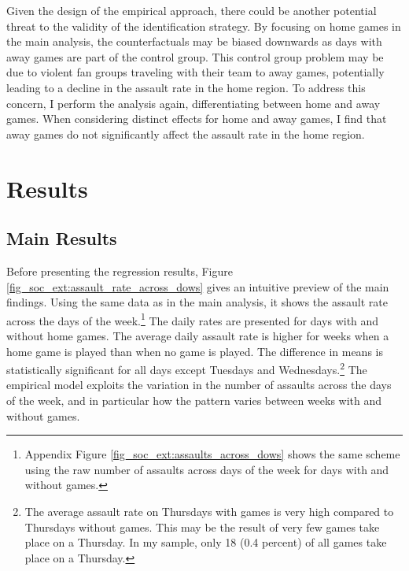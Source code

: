 Given the design of the empirical approach, there could be another potential threat to the validity of the identification strategy. By focusing on home games in the main analysis, the counterfactuals may be biased downwards as days with away games are part of the control group. This control group problem may be due to violent fan groups traveling with their team to away games, potentially leading to a decline in the assault rate in the home region. To address this concern, I perform the analysis again, differentiating between home and away games. When considering distinct effects for home and away games, I find that away games do not significantly affect the assault rate in the home region. 









\bigskip
\section{Results}\label{sec_soc_ext:results}



\subsection{Main Results}



Before presenting the regression results, Figure \ref{fig_soc_ext:assault_rate_across_dows} gives an intuitive preview of the main findings. Using the same data as in the main analysis, it shows the assault rate across the days of the week.\footnote{Appendix Figure \ref{fig_soc_ext:assaults_across_dows} shows the same scheme using the raw number of assaults across days of the week for days with and without games.} The daily rates are presented for days with and without home games. The average daily assault rate is higher for weeks when a home game is played than when no game is played. The difference in means is statistically significant for all days except Tuesdays and Wednesdays.\footnote{The average assault rate on Thursdays with games is very high compared to Thursdays without games. This may be the result of very few games take place on a Thursday. In my sample, only 18 (0.4 percent) of all games take place on a Thursday.} The empirical model exploits the variation in the number of assaults across the days of the week, and in particular how the pattern varies between weeks with and without games.

